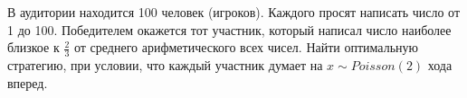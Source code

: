 \begin{comment}
 \begin{problem}
 В аудитории находится невеста, которая хочет выбрать себе жениха. За дверью выстроилась очередь из $N$ женихов. Относительно любых 
 двух женихов невеста может сделать вывод, какой из них для неё предпочтительнее. Таким образом, невеста задает на множестве женихов 
 отношение порядка (естественно считать, что если $A$ предпочтительнее $B$, а $B$ предпочтительнее $C$, то $A$ предпочтительнее $C$). 
 Предположим, что все $N!$ вариантов очередей равновероятны и невеста об этом знает (равно, как и число $N$). Женихи запускаются 
 в аудиторию по очереди. Невеста видит каждого из них в первый раз! Если на каком-то женихе невеста остановится (сделает свой выбор), 
 то оставшаяся очередь расходится. Невеста хочет выбрать наилучшего жениха (исследуя $k$–го по очереди жениха, невеста лишь может 
 сравнить его со всеми предыдущими, которых она уже просмотрела и пропустила). Оцените (при $N\to\infty$) вероятность того, что невесте 
 удастся выбрать наилучшего жениха, если она придерживается следующей стратегии: просмотреть (пропустить) первых по очереди $[N/e]$ 
 кандидатов и затем выбрать первого кандидата, который лучше всех предыдущих (впрочем, такого кандидата может и не оказаться, тогда, 
 очевидно, невеста не смогла выбрать наилучшего жениха). 
 \end{problem}
 
 \end{comment}
 

\begin{problem}
В аудитории находится 100 человек (игроков). Каждого просят написать  число от 1 до 100. Победителем окажется тот участник, который написал число наиболее близкое к $\frac{2}{3}$ от среднего арифметического всех чисел. Найти оптимальную стратегию, при условии, что каждый участник думает на $x \sim Poisson(2)$  хода  вперед.  
\end{problem}

